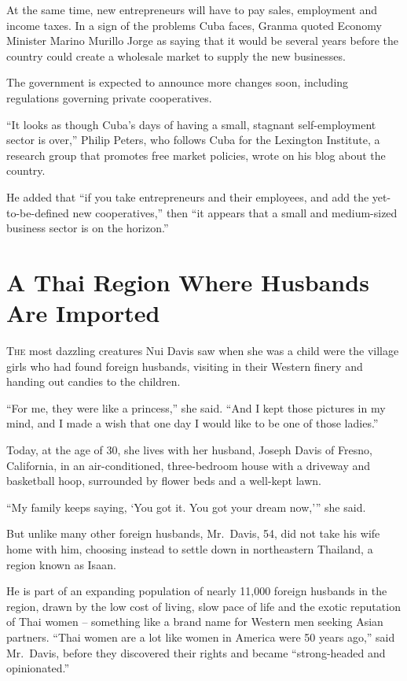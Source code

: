 ﻿\documentclass[12pt]{article}
\begin{document}
At the same time, new entrepreneurs will have to pay sales, employment and income taxes. In a sign
of the problems Cuba faces, Granma quoted Economy Minister Marino Murillo Jorge as saying that it
would be several years before the country could create a wholesale market to supply the new
businesses.

The government is expected to announce more changes soon, including regulations governing private
cooperatives.

``It looks as though Cuba's days of having a small, stagnant self-employment sector is over,''
Philip Peters, who follows Cuba for the Lexington Institute, a research group that promotes free
market policies, wrote on his blog about the country.

He added that ``if you take entrepreneurs and their employees, and add the yet-to-be-defined new
cooperatives,'' then ``it appears that a small and medium-sized business sector is on the horizon.''

\pagebreak
\section{A Thai Region Where Husbands Are Imported}

\lettrine{T}{he} most dazzling creatures Nui Davis saw when she was a child
were the village girls who had found foreign husbands, visiting in their Western finery and handing
out candies to the children.

``For me, they were like a princess,'' she said. ``And I kept those pictures in my mind, and I made
a wish that one day I would like to be one of those ladies.''

Today, at the age of 30, she lives with her husband, Joseph Davis of Fresno, California, in an
air-conditioned, three-bedroom house with a driveway and basketball hoop, surrounded by flower beds
and a well-kept lawn.

``My family keeps saying, `You got it. You got your dream now,''' she said.

But unlike many other foreign husbands, Mr.~Davis, 54, did not take his wife home with him, choosing
instead to settle down in northeastern Thailand, a region known as Isaan.

He is part of an expanding population of nearly 11,000 foreign husbands in the region, drawn by the
low cost of living, slow pace of life and the exotic reputation of Thai women -- something like a
brand name for Western men seeking Asian partners. ``Thai women are a lot like women in America were
50 years ago,'' said Mr.~Davis, before they discovered their rights and became ``strong-headed and
opinionated.''
\end{document}
